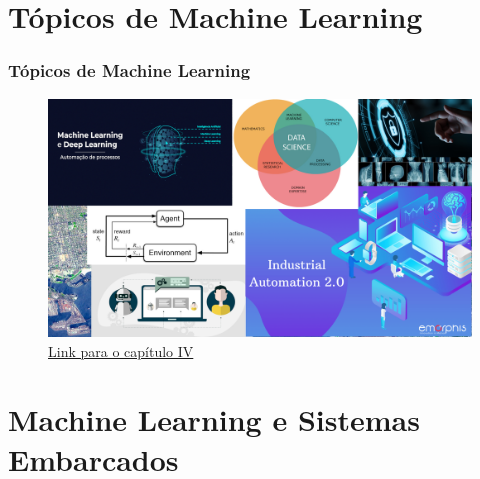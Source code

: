 \documentclass{beamer}
\begin{document}
\section{Tópicos de Machine Learning}

\begin{frame}

    \frametitle{Tópicos de Machine Learning}
    \begin{figure}[ht]
        \centering
        \includegraphics[scale=0.5]{Capitulo4.png}
        \caption{\href{./capitulos/Capitulo_04/Capitulo04.pdf}{Link para o capítulo IV}}
    \end{figure}

\end{frame}

\section{Machine Learning e Sistemas Embarcados}
\end{document}
